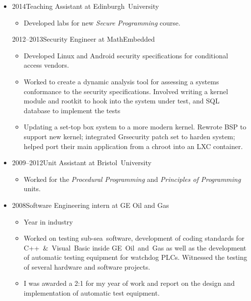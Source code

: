 \documentclass[10pt,selectp]{book}
\newcommand{\lowercaps}[1]{\textsc{\MakeLowercase{#1}}}
\newcommand{\sideheading}[1]{\vspace{0.5em}\marginnote[\color{BrickRed}\raggedleft\lowercaps{#1}]{\raggedleft\lowercaps{#1}}}
\newcommand{\listhead}[1]{#1}
\begin{document}
\begin{itemize}
  \item 
    \sideheading{Experience}%
    \listhead{2014\hspace{1em}Teaching Assistant at Edinburgh~University}
    \begin{itemize}
        \item[] Developed labs for new \emph{Secure Programming} course.
    \end{itemize}
    \listhead{2012–2013\hspace{1em}Security Engineer at MathEmbedded}
    \begin{itemize}
      \item[] Developed Linux and Android security specifications for conditional access vendors.  
      \item[] Worked to create a dynamic analysis tool for assessing a systems
	      conformance to the security specifications.  Involved writing a
	      kernel module and rootkit to hook into the system under test, and
	      SQL database to implement the tests
      \item[] Updating a set-top box system to a more modern kernel.  Rewrote
	      BSP to support new kernel; integrated Grsecurity patch set to
	      harden system; helped port their main application from a chroot
	      into an LXC container.
    \end{itemize}

    \item\listhead{2009–2012\hspace{1em}Unit Assistant at Bristol~University}
    \begin{itemize}
      \item[] Worked for the \textit{Procedural Programming} and \textit{Principles of Programming} units.
    \end{itemize}

  \item \listhead{2008\hspace{1em}Software Engineering intern at GE Oil and Gas}
    \begin{itemize}
      \item[] Year in industry
      \item[] Worked on testing sub-sea~software, development of coding
        standards for C++~\&~Visual~Basic inside GE~Oil~and~Gas as well as the
        development of automatic testing equipment for watchdog PLCs.
        Witnessed the testing of several hardware and software
        projects.
      \item[] I was awarded a 2:1 for my year of work and report on the design
        and implementation of automatic test equipment.
    \end{itemize}


\end{itemize}
\end{document}
